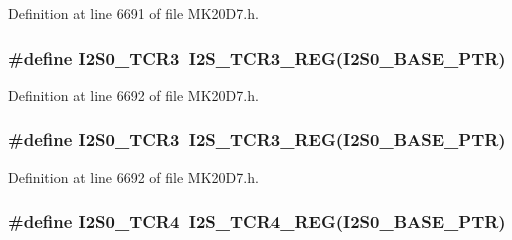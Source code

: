 Definition at line 6691 of file M\+K20\+D7.\+h.

\subsubsection[{\texorpdfstring{I2\+S0\+\_\+\+T\+C\+R3}{I2S0_TCR3}}]{\setlength{\rightskip}{0pt plus 5cm}\#define I2\+S0\+\_\+\+T\+C\+R3~{\bf I2\+S\+\_\+\+T\+C\+R3\+\_\+\+R\+EG}({\bf I2\+S0\+\_\+\+B\+A\+S\+E\+\_\+\+P\+TR})}\hypertarget{group___i2_s___register___accessor___macros_gaa547e454977db00732654fb9d05f8df8}{}\label{group___i2_s___register___accessor___macros_gaa547e454977db00732654fb9d05f8df8}


Definition at line 6692 of file M\+K20\+D7.\+h.

\subsubsection[{\texorpdfstring{I2\+S0\+\_\+\+T\+C\+R3}{I2S0_TCR3}}]{\setlength{\rightskip}{0pt plus 5cm}\#define I2\+S0\+\_\+\+T\+C\+R3~{\bf I2\+S\+\_\+\+T\+C\+R3\+\_\+\+R\+EG}({\bf I2\+S0\+\_\+\+B\+A\+S\+E\+\_\+\+P\+TR})}\hypertarget{group___i2_s___register___accessor___macros_gaa547e454977db00732654fb9d05f8df8}{}\label{group___i2_s___register___accessor___macros_gaa547e454977db00732654fb9d05f8df8}


Definition at line 6692 of file M\+K20\+D7.\+h.

\subsubsection[{\texorpdfstring{I2\+S0\+\_\+\+T\+C\+R4}{I2S0_TCR4}}]{\setlength{\rightskip}{0pt plus 5cm}\#define I2\+S0\+\_\+\+T\+C\+R4~{\bf I2\+S\+\_\+\+T\+C\+R4\+\_\+\+R\+EG}({\bf I2\+S0\+\_\+\+B\+A\+S\+E\+\_\+\+P\+TR})}\hypertarget{group___i2_s___register___accessor___macros_gaa4db90a1523128f0d06710664466359a}{}\label{group___i2_s___register___accessor___macros_gaa4db90a1523128f0d06710664466359a}


